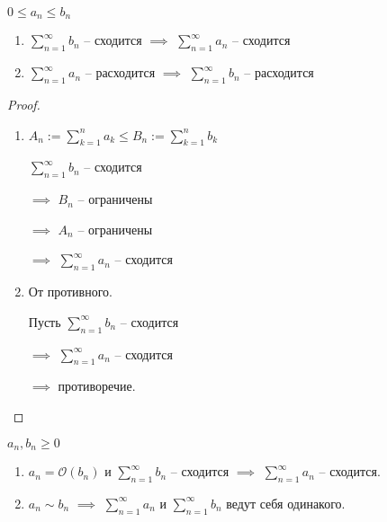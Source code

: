 \begin{theorem} \thmslashn 

    $0 \le a_n \le b_n$

    \begin{enumerate}
        \item $\sum\limits_{n = 1}^{\infty}b_n$ -- сходится $\implies$ $\sum\limits_{n = 1}^{\infty}a_n$ -- сходится
        \item $\sum\limits_{n = 1}^{\infty}a_n$ -- расходится $\implies$ $\sum\limits_{n = 1}^{\infty}b_n$ -- расходится
    \end{enumerate}
    \begin{proof} \thmslashn 

        \begin{enumerate}
            \item 
            
                $A_n := \sum\limits_{k=1}^{n}a_k \le B_n :=  \sum\limits_{k=1}^{n}b_k$

                $\sum\limits_{n = 1}^{\infty}b_n$ -- сходится 
                
                $\implies$ $B_n$ -- ограничены 
                
                $\implies$ $A_n$ -- ограничены

                $\implies$ $\sum\limits_{n = 1}^{\infty}a_n$ -- сходится

            \item От противного.
            
                Пусть $\sum\limits_{n = 1}^{\infty}b_n$ -- сходится 
                
                $\implies$ $\sum\limits_{n = 1}^{\infty}a_n$ -- сходится 

                $\implies$ противоречие.
        \end{enumerate}
    \end{proof}

    \begin{consequence} \thmslashn 
    
        $a_n, b_n \ge 0$
    
        \begin{enumerate}
            \item $a_n = \mathcal{O}(b_n)$ и $\sum\limits_{n = 1}^{\infty}b_n$ -- сходится $\implies$ $\sum\limits_{n = 1}^{\infty}a_n$ -- сходится.
            \item $a_n \sim b_n$ $\implies$ $\sum\limits_{n = 1}^{\infty}a_n$ и $\sum\limits_{n = 1}^{\infty}b_n$ ведут себя одинакого.
        \end{enumerate}
        

\end{consequence}
\end{theorem}
